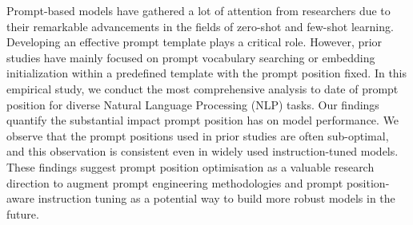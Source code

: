 Prompt-based models have gathered a lot of attention from researchers due to their remarkable advancements in the fields of zero-shot and few-shot learning. Developing an effective prompt template plays a critical role. However, prior studies have mainly focused on prompt vocabulary searching or embedding initialization within a predefined template with the prompt position fixed. In this empirical study, we conduct the most comprehensive analysis to date of prompt position for diverse Natural Language Processing (NLP) tasks. Our findings quantify the substantial impact prompt position has on model performance. We observe that the prompt positions used in prior studies are often sub-optimal, and this observation is consistent even in widely used instruction-tuned models. These findings suggest prompt position optimisation as a valuable research direction to augment prompt engineering methodologies and prompt position-aware instruction tuning as a potential way to build more robust models in the future.